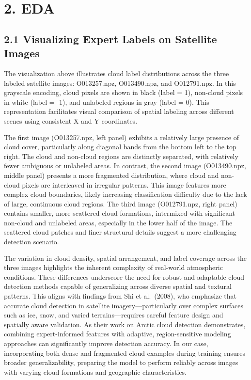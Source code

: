 \documentclass[11pt]{article}
\begin{document}
\section*{2. EDA}\label{eda}

    \subsection*{2.1 Visualizing Expert Labels on Satellite
Images}\label{visualizing-expert-labels-on-satellite-images}

    The visualization above illustrates cloud label distributions across the
three labeled satellite images: O013257.npz, O013490.npz, and
O012791.npz. In this grayscale encoding, cloud pixels are shown in black
(label = 1), non-cloud pixels in white (label = -1), and unlabeled
regions in gray (label = 0). This representation facilitates visual
comparison of spatial labeling across different scenes using consistent
X and Y coordinates.

The first image (O013257.npz, left panel) exhibits a relatively large
presence of cloud cover, particularly along diagonal bands from the
bottom left to the top right. The cloud and non-cloud regions are
distinctly separated, with relatively fewer ambiguous or unlabeled
areas. In contrast, the second image (O013490.npz, middle panel)
presents a more fragmented distribution, where cloud and non-cloud
pixels are interleaved in irregular patterns. This image features more
complex cloud boundaries, likely increasing classification difficulty
due to the lack of large, continuous cloud regions. The third image
(O012791.npz, right panel) contains smaller, more scattered cloud
formations, intermixed with significant non-cloud and unlabeled areas,
especially in the lower half of the image. The scattered cloud patches
and finer structural details suggest a more challenging detection
scenario.

The variation in cloud density, spatial arrangement, and label coverage
across the three images highlights the inherent complexity of real-world
atmospheric conditions. These differences underscore the need for robust
and adaptable cloud detection methods capable of generalizing across
diverse spatial and textural patterns. This aligns with findings from
Shi et al.~(2008), who emphasize that accurate cloud detection in
satellite imagery---particularly over complex surfaces such as ice,
snow, and varied terrains---requires careful feature design and
spatially aware validation. As their work on Arctic cloud detection
demonstrates, combining expert-informed features with adaptive,
region-sensitive modeling approaches can significantly improve detection
accuracy. In our case, incorporating both dense and fragmented cloud
examples during training ensures broader generalizability, preparing the
model to perform reliably across images with varying cloud formations
and geographic characteristics.
\end{document}
